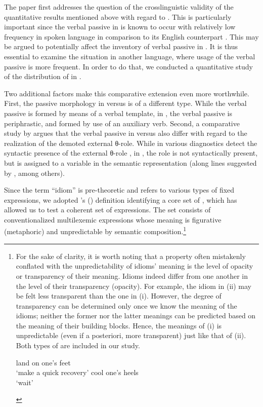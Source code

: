 \documentclass[output=paper]{langsci/langscibook}
\begin{document}
The paper first addresses the question of the crosslinguistic validity of the
quantitative results mentioned above with regard to . This is
particularly important since the verbal passive in  is known to
occur with relatively low frequency in spoken language in comparison to its
English counterpart \citep{Berman2008}. This may be argued to potentially
affect the inventory of verbal passive  in . It is thus
essential to examine the situation in another language, where usage of the
verbal passive is more frequent. In order to do that, we conducted a
quantitative study of the distribution of  in .

Two additional factors make this comparative extension even more worthwhile.
First, the passive morphology in  versus  is of a different
type.  While the  verbal passive is formed by means of a verbal
template, in , the verbal passive is periphrastic, and formed by use of
an auxiliary verb. Second, a comparative study by \citet{Meltzer-Asscher2012}
argues that the verbal passive in  versus  also differ with
regard to the realization of the demoted external θ-role. While in 
various diagnostics detect the syntactic presence of the external θ-role
\parencite[e.g.][]{Jaeggli1986,BakJohRob1989,Collins2005}, in , the
role is not syntactically present, but is assigned to a variable in the
semantic representation (along lines suggested by
\citealt{Chierchia2004,Reinhart2002,HorSil2009}, among others).

Since the term ``idiom'' is pre-theoretic and refers to various types of fixed
expressions, we adopted \citeauthor{HorSil2017}’s
(\citeyear{HorSil2017,HorSil2019}) definition identifying a core set of
, which has allowed us to test a coherent set of expressions. The
set consists of conventionalized multilexemic expressions whose meaning is
figurative (metaphoric) and unpredictable by semantic composition.\footnote{For
    the sake of clarity, it is worth noting that a property often mistakenly
    conflated with the unpredictability of idioms’ meaning is the level of
    opacity or transparency of their meaning. Idioms indeed differ from one
    another in the level of their transparency (opacity).  For example, the
    idiom in (ii) may be felt less transparent than the one in (i).  However,
    the degree of transparency can be determined only once we know the meaning
    of the idioms; neither the former nor the latter meanings can be predicted
    based on the meaning of their building blocks. Hence, the meanings of (i)
    is unpredictable (even if a posteriori, more transparent) just like that of
    (ii). Both types of  are included in our study.

    \begin{exe}
            land on one’s feet\\
            ‘make a quick recovery’
         cool one’s heels\\
            \enquote*{wait}
    \end{exe}}
\end{document}
